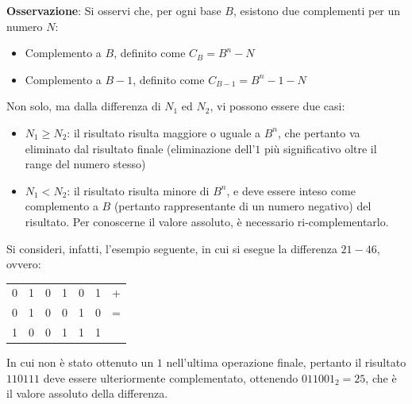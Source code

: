 \documentclass[a4paper]{extarticle}
\renewcommand\arraystretch{}
\begin{document}
\vspace{1em}
\noindent
\textbf{Osservazione}: Si osservi che, per ogni base $B$, esistono due complementi per un numero $N$:
\begin{itemize}
    \item Complemento a $B$, definito come $C_B = B^n-N$
    \item Complemento a $B-1$, definito come $C_{B-1}=B^n-1-N$
\end{itemize}
Non solo, ma dalla differenza di $N_1$ ed $N_2$, vi possono essere due casi:
\begin{itemize}
    \item $N_1 \geq N_2$: il risultato risulta maggiore o uguale a $B^n$, che pertanto va eliminato dal risultato finale (eliminazione dell'$1$ più significativo oltre il range del numero stesso)
    \item $N_1 < N_2$: il risultato risulta minore di $B^n$, e deve essere inteso come complemento a $B$ (pertanto rappresentante di un numero negativo) del risultato. Per conoscerne il valore assoluto, è necessario ri-complementarlo.
\end{itemize}
Si consideri, infatti, l'esempio seguente, in cui si esegue la differenza $21-46$, ovvero:

\vspace{1em}
\noindent
\begin{table}[H]
\setlength{\tabcolsep}{4pt}
\renewcommand{\arraystretch}{1.2}
\centering
\begin{tabular}{ccccccc}
    0 & 1 & 0 & 1 & 0 & 1 & +\\
    0 & 1 & 0 & 0 & 1 & 0 & =\\
    \hline
    1 & 0 & 0 & 1 & 1 & 1
\end{tabular}
\end{table}
\vspace{1em}

\noindent
In cui non è stato ottenuto un $1$ nell'ultima operazione finale, pertanto il risultato $110111$ deve essere ulteriormente complementato, ottenendo $011001_2=25$, che è il valore assoluto della differenza.

\vspace{1em}
\noindent
\end{document}
